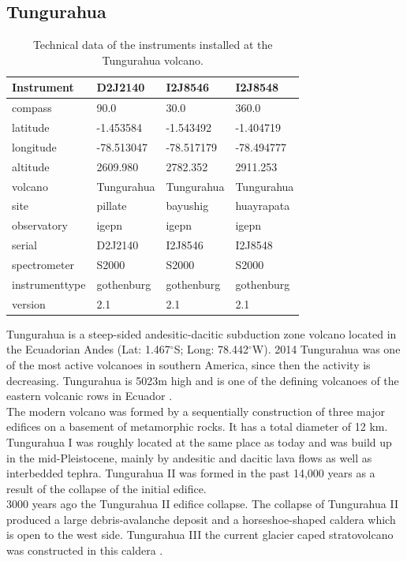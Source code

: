 				\subsection*{Tungurahua \label{Tung}}
		\begin{table}
			\centering
			\begin{tabular}{|p{4cm}|p{3cm}|p{3cm}|p{3cm}|}
				Instrument	&D2J2140&I2J8546& I2J8548\\
				\toprule
				compass&90.0	&	30.0	&	360.0	\\
				latitude&-1.453584	&	-1.543492	&-1.404719	\\
				longitude&-78.513047	&-78.517179	&	-78.494777	\\
				altitude&2609.980	&	2782.352	&	2911.253	\\
				volcano&Tungurahua	&Tungurahua	&	Tungurahua	\\
				site&pillate	&	bayushig	&	huayrapata	\\
				observatory&igepn	&	igepn	&igepn	\\
				serial&D2J2140	&	I2J8546	&	I2J8548	\\
				spectrometer&S2000	&	S2000	&S2000	\\
				instrumenttype&gothenburg	&gothenburg	&gothenburg	\\
				version&2.1	&2.1	&	2.1	\\
				\bottomrule
			\end{tabular}
			\caption{Technical data of the instruments installed at the Tungurahua volcano.}
			\label{tab:TInstruments}
		\end{table}
		Tungurahua is a steep-sided andesitic-dacitic subduction zone volcano located in the Ecuadorian Andes (Lat: 1.467$^{\circ}$S; Long: 78.442$^{\circ}$W). 2014 Tungurahua was one of the most active volcanoes in southern America, since then the activity is decreasing. Tungurahua is 5023m high and is one of the defining volcanoes of the eastern volcanic rows in Ecuador \citep{hall1999tungurahua}.
		\\
		The modern volcano was formed by a sequentially construction of three major edifices on a basement of metamorphic rocks. It has a total diameter of 12 km. Tungurahua I was roughly located at the same place as today and was build up in the mid-Pleistocene, mainly by andesitic and dacitic lava flows as well as interbedded tephra. Tungurahua II was formed in the past 14,000 years as a result of the collapse of the initial edifice.\\
		3000 years ago the Tungurahua II edifice collapse. The collapse of Tungurahua II produced a large debris-avalanche deposit and a horseshoe-shaped caldera which is open to the west side. Tungurahua III the current glacier caped stratovolcano was constructed in this caldera \citep{GlobalVolcanismProgram}.\\
